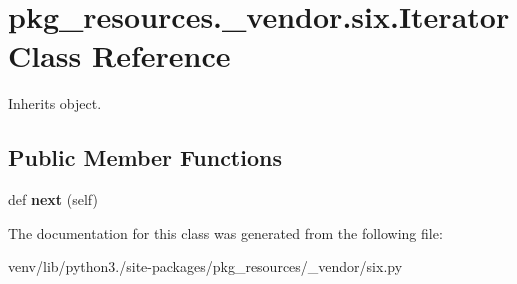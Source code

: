 \hypertarget{classpkg__resources_1_1__vendor_1_1six_1_1_iterator}{}\section{pkg\+\_\+resources.\+\_\+vendor.\+six.\+Iterator Class Reference}
\label{classpkg__resources_1_1__vendor_1_1six_1_1_iterator}


Inherits object.

\subsection*{Public Member Functions}
\begin{DoxyCompactItemize}
\item 
\mbox{\label{classpkg__resources_1_1__vendor_1_1six_1_1_iterator_a10e9dfcd640809744a5db88277ca62d9}} 
def {\bfseries next} (self)
\end{DoxyCompactItemize}


The documentation for this class was generated from the following file\+:\begin{DoxyCompactItemize}
\item 
venv/lib/python3./site-\/packages/pkg\+\_\+resources/\+\_\+vendor/six.\+py\end{DoxyCompactItemize}
